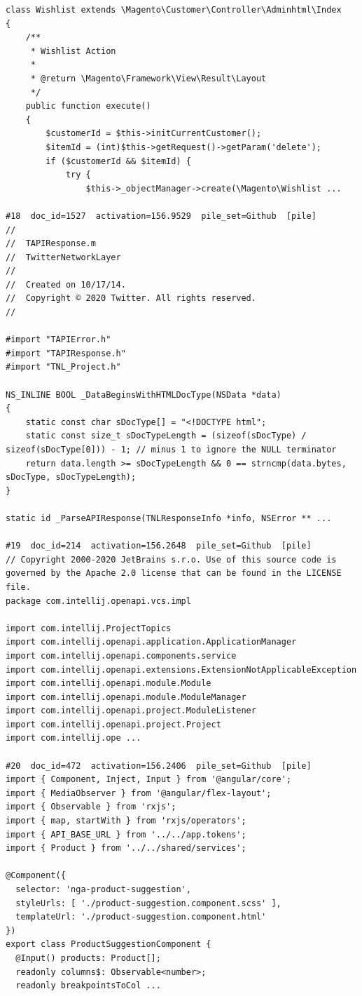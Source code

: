 \begin{verbatim}
class Wishlist extends \Magento\Customer\Controller\Adminhtml\Index
{
    /**
     * Wishlist Action
     *
     * @return \Magento\Framework\View\Result\Layout
     */
    public function execute()
    {
        $customerId = $this->initCurrentCustomer();
        $itemId = (int)$this->getRequest()->getParam('delete');
        if ($customerId && $itemId) {
            try {
                $this->_objectManager->create(\Magento\Wishlist ...

#18  doc_id=1527  activation=156.9529  pile_set=Github  [pile]
//
//  TAPIResponse.m
//  TwitterNetworkLayer
//
//  Created on 10/17/14.
//  Copyright © 2020 Twitter. All rights reserved.
//

#import "TAPIError.h"
#import "TAPIResponse.h"
#import "TNL_Project.h"

NS_INLINE BOOL _DataBeginsWithHTMLDocType(NSData *data)
{
    static const char sDocType[] = "<!DOCTYPE html";
    static const size_t sDocTypeLength = (sizeof(sDocType) / sizeof(sDocType[0])) - 1; // minus 1 to ignore the NULL terminator
    return data.length >= sDocTypeLength && 0 == strncmp(data.bytes, sDocType, sDocTypeLength);
}

static id _ParseAPIResponse(TNLResponseInfo *info, NSError ** ...

#19  doc_id=214  activation=156.2648  pile_set=Github  [pile]
// Copyright 2000-2020 JetBrains s.r.o. Use of this source code is governed by the Apache 2.0 license that can be found in the LICENSE file.
package com.intellij.openapi.vcs.impl

import com.intellij.ProjectTopics
import com.intellij.openapi.application.ApplicationManager
import com.intellij.openapi.components.service
import com.intellij.openapi.extensions.ExtensionNotApplicableException
import com.intellij.openapi.module.Module
import com.intellij.openapi.module.ModuleManager
import com.intellij.openapi.project.ModuleListener
import com.intellij.openapi.project.Project
import com.intellij.ope ...

#20  doc_id=472  activation=156.2406  pile_set=Github  [pile]
import { Component, Inject, Input } from '@angular/core';
import { MediaObserver } from '@angular/flex-layout';
import { Observable } from 'rxjs';
import { map, startWith } from 'rxjs/operators';
import { API_BASE_URL } from '../../app.tokens';
import { Product } from '../../shared/services';

@Component({
  selector: 'nga-product-suggestion',
  styleUrls: [ './product-suggestion.component.scss' ],
  templateUrl: './product-suggestion.component.html'
})
export class ProductSuggestionComponent {
  @Input() products: Product[];
  readonly columns$: Observable<number>;
  readonly breakpointsToCol ...

\end{verbatim}

